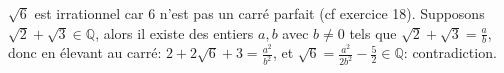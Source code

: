 $\sqrt{6}$ est irrationnel car 6 n'est pas un carré parfait (cf exercice 18). Supposons $\sqrt{2}+\sqrt{3}\in \mathbb{Q}$, alors il existe des entiers $a,b$ avec $b\neq 0$ tels que $\sqrt{2}+\sqrt{3}=\frac{a}{b}$, donc en élevant au carré: $2 + 2\sqrt{6} + 3 = \frac{a^2}{b^2}$, et $\sqrt{6}=\frac{a^2}{2b^2}-\frac{5}{2} \in \mathbb{Q}$: contradiction.
